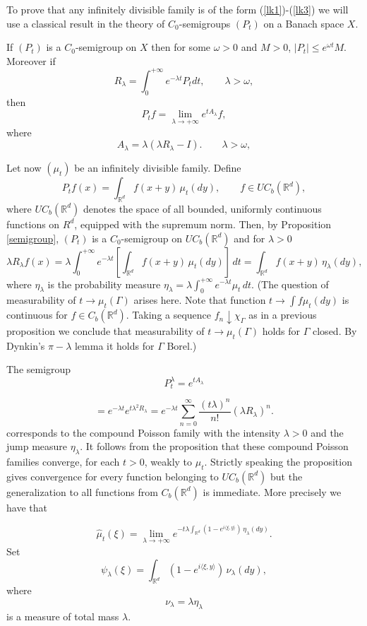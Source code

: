 \documentclass[preprint]{imsart}
\def\R{\mathbb R}
\begin{document}
{\noindent To prove that any infinitely divisible family is of the
form (\ref{lk1})-(\ref{lk3}) we will use a classical
result in the theory of $C_0$-semigroups $(P_t)$ on a
Banach space $X$.

\begin{Proposition}\label{formesponenzclass}
If $(P_t)$ is a $C_0$-semigroup  on   $X$ then for some
$\omega >0$ and $M>0$, $|P_t|\leq e^{\omega t}M$.
Moreover if
$$
R_\lambda = \int_0^{+\infty} e^{-\lambda t}P_tdt,
\qquad \lambda >\omega,
$$
then
$$
P_tf =\lim_{\lambda \to +\infty} e^{tA_\lambda }f,
$$
where
$$
A_\lambda =\lambda \left(\lambda R_\lambda -I\right).
\qquad \lambda >\omega,
$$
\end{Proposition}


\noindent Let now $(\mu_t)$ be an infinitely divisible family.
Define
$$
P_tf(x)=\int_{\R^d} f(x+y)\, \mu_t(dy),
\qquad f\in  UC_b (\R^d),
$$
where $UC_b (\R^d)$ denotes the space of all bounded, uniformly
continuous functions on $R^{d}$, equipped with the supremum norm.
Then, by Proposition \ref{semigroup}, $(P_t)$ is a $C_0$-semigroup on $UC_b (\R^d)$
and for $\lambda >0$
$$
\lambda R_\lambda f(x) =
\lambda \int_0^{+\infty}e^{-\lambda t}\left[
\int_{\R^d}f(x+y)\, \mu_t(dy)\right] \, dt
=\int_{\R^d}f(x+y)\, \eta _\lambda (dy),
$$
where $\eta _\lambda$ is the probability measure
$\eta_\lambda = \lambda \int_0^{+\infty}e^{-\lambda
t}\mu_t\, dt$. (The question of measurability of $t\to \mu_t(\Gamma)$ arises
here. Note that function   $t\to \int f\mu_t(dy)$ is
continuous for $f\in C_b(\R^d)$. Taking a sequence
$f_n\downarrow \chi_\Gamma$  as in a previous proposition we
conclude that measurability of $t\to \mu_t(\Gamma)$ holds
for $\Gamma$ closed. By Dynkin's $\pi -\lambda$ lemma it
holds for $\Gamma$ Borel.)

\noindent The
semigroup
$$
P_t^\lambda = e^{tA_\lambda}
$$

$$
=e^{-\lambda t}e^{t\lambda^2 R_\lambda}
=e^{-\lambda t}\sum_{n=0}^\infty
\frac{(t\lambda)^n}{n!}(\lambda R_\lambda)^n.
$$
 corresponds to the compound Poisson family with the
intensity $\lambda >0$ and the jump measure
$\eta_\lambda$. It follows from the proposition that
these compound Poisson families converge, for each
$t>0$,  weakly to $\mu_t$. Strictly speaking the proposition gives convergence
for every function
belonging to $UC_b (\R^d)$ but the generalization to all functions from
$C_b (\R^d)$ is
immediate. More precisely we have that

\begin{equation}\label{lk4}
\widehat{\mu}_t(\xi) =\lim_{\lambda \to +\infty}
e^{-t\lambda \int_{\R^d} \left( 1- e^{i\langle
\xi,y\rangle}\right)\,\eta_\lambda (dy) }.
\end{equation}
Set
\begin{equation}\label{lk5}
\psi_\lambda (\xi) =
\int_{\R^d} \left( 1- e^{i\langle
\xi,y\rangle}\right)\,\nu_\lambda (dy),
\end{equation}
where
$$ \nu_\lambda =\lambda\eta_\lambda$$
is
a measure of total mass $\lambda$.

}
\end{document}
